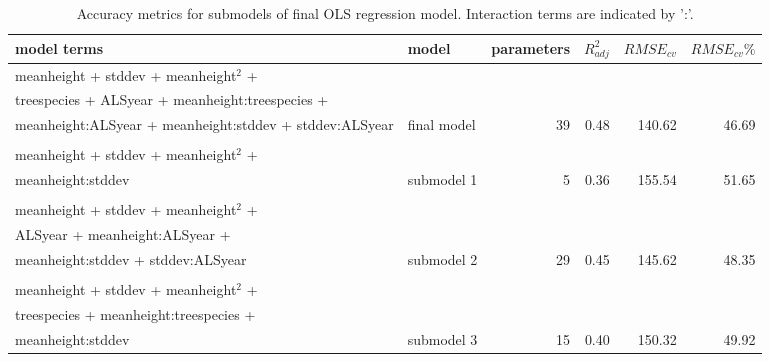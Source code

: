 \begin{table*}
	\centering
	\caption{Accuracy metrics for submodels of final OLS regression model. Interaction terms are indicated by ':'.} 
	\label{tab:modacc_modterms}
	\begin{tabular}{llrrrr}
  \hline
model terms & model & parameters & $R^2_{adj}$ & $RMSE_{cv}$ & $RMSE_{cv}\%$ \\ 
  \hline
  meanheight + stddev + meanheight$^2$ + \\ treespecies + ALSyear + meanheight:treespecies + \\ meanheight:ALSyear + meanheight:stddev + stddev:ALSyear & final model &  39 & 0.48 & 140.62 & 46.69 \\ \\
  meanheight + stddev + meanheight$^2$ + \\ meanheight:stddev & submodel 1 &   5 & 0.36 & 155.54 & 51.65 \\ \\
  meanheight + stddev + meanheight$^2$ + \\ ALSyear + meanheight:ALSyear + \\ meanheight:stddev + stddev:ALSyear & submodel 2 &  29 & 0.45 & 145.62 & 48.35 \\ \\
  meanheight + stddev + meanheight$^2$ + \\ treespecies + meanheight:treespecies + \\ meanheight:stddev & submodel 3 &  15 & 0.40 & 150.32 & 49.92 \\ 
   \hline
\hline
\end{tabular}
\end{table*}


